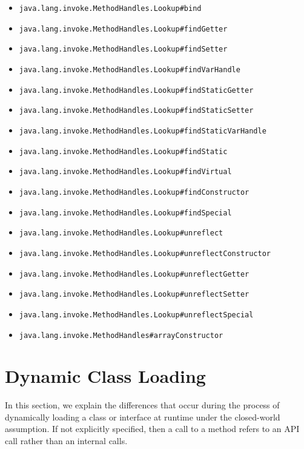\begin{itemize}
    \item \texttt{java.lang.invoke.MethodHandles.Lookup\#bind} 
    \item \texttt{java.lang.invoke.MethodHandles.Lookup\#findGetter} 
    \item \texttt{java.lang.invoke.MethodHandles.Lookup\#findSetter} 
    \item \texttt{java.lang.invoke.MethodHandles.Lookup\#findVarHandle} 
    \item \texttt{java.lang.invoke.MethodHandles.Lookup\#findStaticGetter} 
    \item \texttt{java.lang.invoke.MethodHandles.Lookup\#findStaticSetter} 
    \item \texttt{java.lang.invoke.MethodHandles.Lookup\#findStaticVarHandle} 
    \item \texttt{java.lang.invoke.MethodHandles.Lookup\#findStatic} 
    \item \texttt{java.lang.invoke.MethodHandles.Lookup\#findVirtual} 
    \item \texttt{java.lang.invoke.MethodHandles.Lookup\#findConstructor} 
    \item \texttt{java.lang.invoke.MethodHandles.Lookup\#findSpecial} 
    \item \texttt{java.lang.invoke.MethodHandles.Lookup\#unreflect} 
    \item \texttt{java.lang.invoke.MethodHandles.Lookup\#unreflectConstructor} 
    \item \texttt{java.lang.invoke.MethodHandles.Lookup\#unreflectGetter} 
    \item \texttt{java.lang.invoke.MethodHandles.Lookup\#unreflectSetter} 
    \item \texttt{java.lang.invoke.MethodHandles.Lookup\#unreflectSpecial} 
    \item \texttt{java.lang.invoke.MethodHandles\#arrayConstructor}
\end{itemize}

\section{Dynamic Class Loading}
In this section, we explain the differences that occur during the process of dynamically loading a class or interface at runtime under the closed-world assumption. If not explicitly specified, then a call to a method refers to an API call rather than an internal calls.

